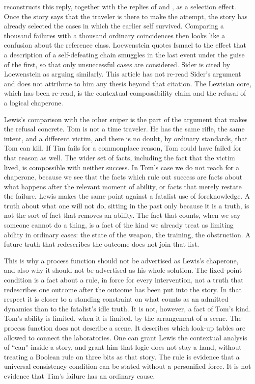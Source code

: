 \documentclass[11pt]{article}
\begin{document}
\citet{loewenstein2022} reconstructs this reply, together with the replies of \citet{ismael2003} and \citet{sider2002}, as a selection effect. Once the story says that the traveler is there to make the attempt, the story has already selected the cases in which the earlier self survived. Comparing a thousand failures with a thousand ordinary coincidences then looks like a confusion about the reference class. Loewenstein quotes Ismael to the effect that a description of a self-defeating chain smuggles in the last event under the guise of the first, so that only unsuccessful cases are considered. Sider is cited by Loewenstein as arguing similarly. This article has not re-read Sider's argument and does not attribute to him any thesis beyond that citation. The Lewisian core, which has been re-read, is the contextual compossibility claim and the refusal of a logical chaperone.

Lewis's comparison with the other sniper is the part of the argument that makes the refusal concrete. Tom is not a time traveler. He has the same rifle, the same intent, and a different victim, and there is no doubt, by ordinary standards, that Tom can kill. If Tim fails for a commonplace reason, Tom could have failed for that reason as well. The wider set of facts, including the fact that the victim lived, is compossible with neither success. In Tom's case we do not reach for a chaperone, because we see that the facts which rule out success are facts about what happens after the relevant moment of ability, or facts that merely restate the failure. Lewis makes the same point against a fatalist use of foreknowledge. A truth about what one will not do, sitting in the past only because it is a truth, is not the sort of fact that removes an ability. The fact that counts, when we say someone cannot do a thing, is a fact of the kind we already treat as limiting ability in ordinary cases: the state of the weapon, the training, the obstruction. A future truth that redescribes the outcome does not join that list.

This is why a process function should not be advertised as Lewis's chaperone, and also why it should not be advertised as his whole solution. The fixed-point condition is a fact about a rule, in force for every intervention, not a truth that redescribes one outcome after the outcome has been put into the story. In that respect it is closer to a standing constraint on what counts as an admitted dynamics than to the fatalist's idle truth. It is not, however, a fact of Tom's kind. Tom's ability is limited, when it is limited, by the arrangement of a scene. The process function does not describe a scene. It describes which look-up tables are allowed to connect the laboratories. One can grant Lewis the contextual analysis of ``can'' inside a story, and grant him that logic does not stay a hand, without treating a Boolean rule on three bits as that story. The rule is evidence that a universal consistency condition can be stated without a personified force. It is not evidence that Tim's failure has an ordinary cause.
\end{document}
